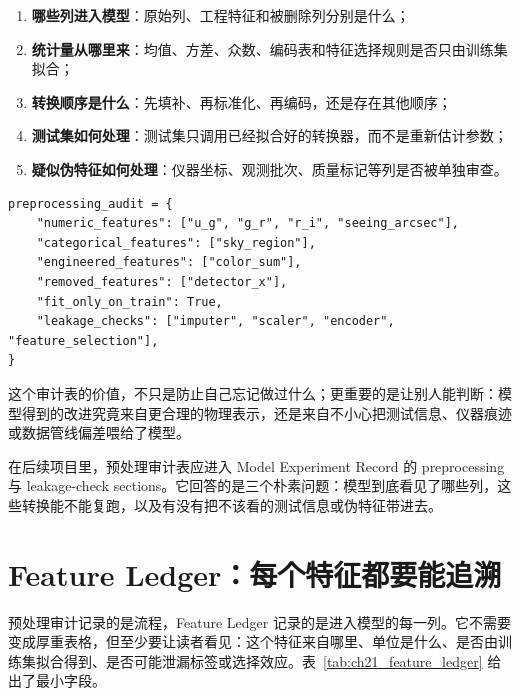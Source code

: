\begin{enumerate}
    \item \textbf{哪些列进入模型}：原始列、工程特征和被删除列分别是什么；
    \item \textbf{统计量从哪里来}：均值、方差、众数、编码表和特征选择规则是否只由训练集拟合；
    \item \textbf{转换顺序是什么}：先填补、再标准化、再编码，还是存在其他顺序；
    \item \textbf{测试集如何处理}：测试集只调用已经拟合好的转换器，而不是重新估计参数；
    \item \textbf{疑似伪特征如何处理}：仪器坐标、观测批次、质量标记等列是否被单独审查。
\end{enumerate}

\begin{examplebox}[预处理审计表的最小字段]
\begin{lstlisting}[style=pythonstyle]
preprocessing_audit = {
    "numeric_features": ["u_g", "g_r", "r_i", "seeing_arcsec"],
    "categorical_features": ["sky_region"],
    "engineered_features": ["color_sum"],
    "removed_features": ["detector_x"],
    "fit_only_on_train": True,
    "leakage_checks": ["imputer", "scaler", "encoder", "feature_selection"],
}
\end{lstlisting}
\end{examplebox}

这个审计表的价值，不只是防止自己忘记做过什么；更重要的是让别人能判断：模型得到的改进究竟来自更合理的物理表示，还是来自不小心把测试信息、仪器痕迹或数据管线偏差喂给了模型。

在后续项目里，预处理审计表应进入 Model Experiment Record 的 preprocessing 与 leakage-check sections。它回答的是三个朴素问题：模型到底看见了哪些列，这些转换能不能复跑，以及有没有把不该看的测试信息或伪特征带进去。

\section{Feature Ledger：每个特征都要能追溯}

预处理审计记录的是流程，Feature Ledger 记录的是进入模型的每一列。它不需要变成厚重表格，但至少要让读者看见：这个特征来自哪里、单位是什么、是否由训练集拟合得到、是否可能泄漏标签或选择效应。表~\ref{tab:ch21_feature_ledger} 给出了最小字段。


